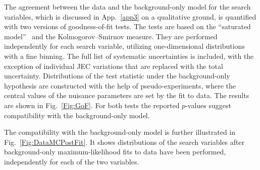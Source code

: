 The agreement between the data and the background-only model for the search variables, which is discussed in App.~\ref{app3} on a qualitative ground, is quantified with two versions of goodness-of-fit tests.
The tests are based on the ``saturated model''~\cite{Baker:1983tu, Wiki:GoF} and the Kolmogorov--Smirnov measure.
They are performed independently for each search variable, utilizing one-dimensional distributions with a fine binning.
The full list of systematic uncertainties is included, with the exception of individual JEC variations that are replaced with the total uncertainty.
Distributions of the test statistic under the background-only hypothesis are constructed with the help of pseudo-experiments, where the central values of the nuisance parameters are set by the fit to data.
The results are shown in Fig.~\ref{Fig:GoF}.
For both tests the reported $p$-values suggest compatibility with the background-only model.

The compatibility with the background-only model is further illustrated in Fig.~\ref{Fig:DataMCPostFit}.
It shows distributions of the search variables after background-only maximum-likelihood fits to data have been performed, independently for each of the two variables.

